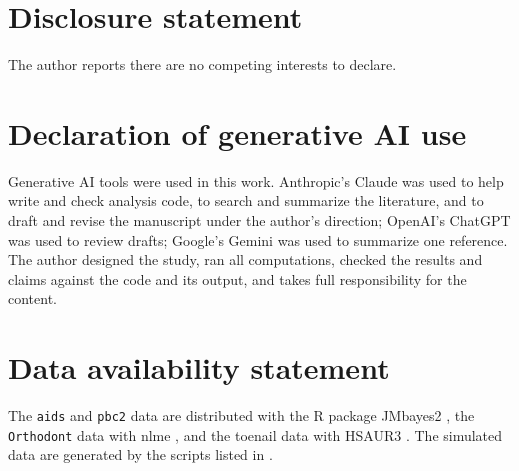 \section*{Disclosure statement}\label{disclosure-statement}

The author reports there are no competing interests to declare.

\section*{Declaration of generative AI use}\label{ai-statement}

Generative AI tools were used in this work. Anthropic's Claude was used to
help write and check analysis code, to search and summarize the
literature, and to draft and revise the manuscript under the author's
direction; OpenAI's ChatGPT was used to review drafts; Google's Gemini was
used to summarize one reference. The author designed the study, ran all
computations, checked the results and claims against the code and its
output, and takes full responsibility for the content.

\section*{Data availability statement}\label{data-availability-statement}

The \texttt{aids} and \texttt{pbc2} data are distributed with the R
package JMbayes2 \citep{jmbayes2}, the \texttt{Orthodont} data with nlme
\citep{pinheiro2000}, and the toenail data with HSAUR3
\citep{hothorn2014}. The simulated data are generated by the scripts listed in
.
